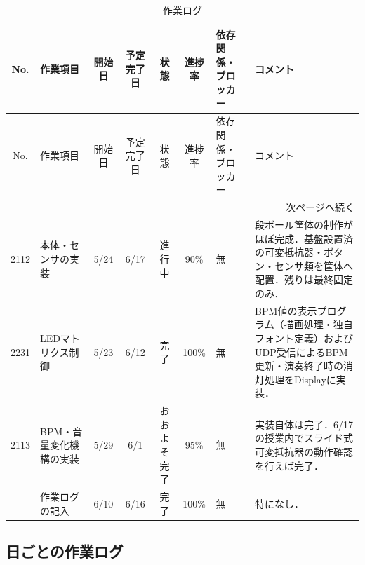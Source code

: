\documentclass[uplatex,dvipdfmx,a4paper,11pt]{jsarticle}
\begin{document}
\begin{longtable}{|c|p{2.2cm}|c|c|c|c|p{2.4cm}|p{3.1cm}|}
\caption{作業ログ} \\
\hline
No. & 作業項目 & 開始日 & 予定完了日 & 状態 & 進捗率 & 依存関係・ブロッカー & コメント \\
\hline
\endfirsthead

\hline
No. & 作業項目 & 開始日 & 予定完了日 & 状態 & 進捗率 & 依存関係・ブロッカー & コメント \\
\hline
\endhead

\hline
\multicolumn{8}{r}{次ページへ続く} \\
\hline
\endfoot

\hline
\endlastfoot

2112 &
本体・センサの実装 &
5/24 &
6/17 &
進行中 &
90\% &
無 &
段ボール筐体の制作がほぼ完成．基盤設置済の可変抵抗器・ボタン・センサ類を筐体へ配置．残りは最終固定のみ． \\
\hline

2231 &
LEDマトリクス制御 &
5/23 &
6/12 &
完了 &
100\% &
無 &
BPM値の表示プログラム（描画処理・独自フォント定義）およびUDP受信によるBPM更新・演奏終了時の消灯処理をDisplayに実装．\\
\hline

2113 &
BPM・音量変化機構の実装 &
5/29 &
6/1 &
おおよそ完了 &
95\% &
無 &
実装自体は完了．6/17の授業内でスライド式可変抵抗器の動作確認を行えば完了． \\
\hline

- &
作業ログの記入 &
6/10 &
6/16 &
完了 &
100\% &
無 &
特になし． \\
\hline



\end{longtable}


\subsection{日ごとの作業ログ}


    \renewcommand{\arraystretch}{1.2}

    \small
\end{document}
